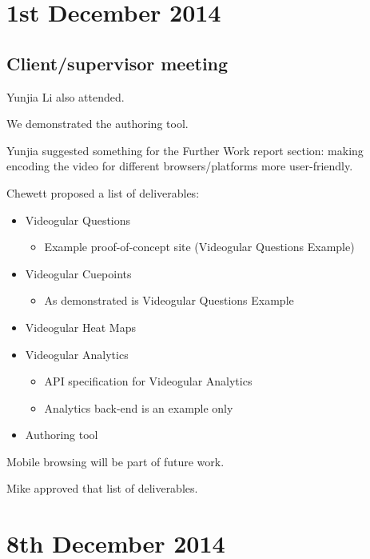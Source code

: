 \section{1st December 2014}\label{Minutes:2014-12-01}

\subsection{Client/supervisor meeting}

Yunjia Li also attended.

We demonstrated the authoring tool.

Yunjia suggested something for the Further Work report section: making
encoding the video for different browsers/platforms more user-friendly.

Chewett proposed a list of deliverables:

\begin{itemize}
\itemsep1pt\parskip0pt
\item
  Videogular Questions

  \begin{itemize}
  \itemsep1pt\parskip0pt
  \item
    Example proof-of-concept site (Videogular Questions Example)
  \end{itemize}
\item
  Videogular Cuepoints

  \begin{itemize}
  \itemsep1pt\parskip0pt
  \item
    As demonstrated is Videogular Questions Example
  \end{itemize}
\item
  Videogular Heat Maps
\item
  Videogular Analytics

  \begin{itemize}
  \itemsep1pt\parskip0pt
  \item
    API specification for Videogular Analytics
  \item
    Analytics back-end is an example only
  \end{itemize}
\item
  Authoring tool
\end{itemize}

Mobile browsing will be part of future work.

Mike approved that list of deliverables.

\section{8th December 2014}\label{Minutes:2014-12-08}

